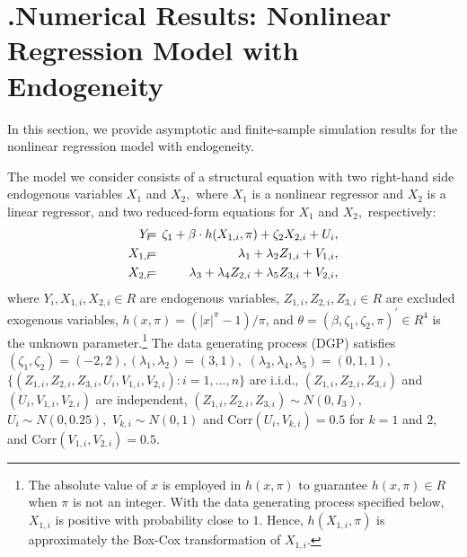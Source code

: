 \documentclass[12pt,titlepage,final,oneside,letterpaper]{article}
\begin{document}
\section{ \hspace{-0.34in}\textbf{.}\hspace{0.2in}Numerical Results:
Nonlinear Regression Model with Endogeneity\label{Numerical Results Sec}}

\hspace{0.25in}\setcounter{equation}{0}In this section, we provide
asymptotic and finite-sample simulation results for the nonlinear regression
model with endogeneity.

The model we consider consists of a structural equation with two right-hand
side endogenous variables $X_{1}$ and $X_{2},$ where $X_{1}$ is a nonlinear
regressor and $X_{2}$ is a linear regressor, and two reduced-form equations
for $X_{1}$ and $X_{2},$ respectively:%
\begin{eqnarray}
Y_{i}\hspace{-0.08in} &=&\hspace{-0.08in}\zeta _{1}+\beta \cdot
h(X_{1,i},\pi )+\zeta _{2}X_{2,i}+U_{i},  \notag \\
X_{1,i}\hspace{-0.08in} &=&\hspace{-0.08in}\lambda _{1}+\lambda
_{2}Z_{1,i}+V_{1,i},  \notag \\
X_{2,i}\hspace{-0.08in} &=&\hspace{-0.08in}\lambda _{3}+\lambda
_{4}Z_{2,i}+\lambda _{5}Z_{3,i}+V_{2,i},
\end{eqnarray}%
where $Y_{i},X_{1,i},X_{2,i}\in R$ are endogenous variables, $%
Z_{1,i},Z_{2,i},Z_{3,i}\in R$ are excluded exogenous variables, $h(x,\pi
)=(|x|^{\pi }-1)/\pi $, and $\theta =(\beta ,\zeta _{1},\zeta _{2},\pi
)^{\prime }\in R^{4}$ is the unknown parameter.\footnote{%
The absolute value of $x$ is employed in $h(x,\pi )$ to guarantee $h(x,\pi
)\in R$ when $\pi $ is not an integer. With the data generating process
specified below, $X_{1,i}$ is positive with probability close to $1.$ Hence, 
$h(X_{1,i},\pi )$ is approximately the Box-Cox transformation of $X_{1,i}.$}
The data generating process (DGP) satisfies $(\zeta _{1},\zeta
_{2})=(-2,2),(\lambda _{1},\lambda _{2})=(3,1),$ $(\lambda _{3},\lambda
_{4},\lambda _{5})=(0,1,1),$ $%
\{(Z_{1,i},Z_{2,i},Z_{3,i},U_{i},V_{1,i},V_{2,i}):i=1,...,n\}$ are i.i.d., $%
(Z_{1,i},Z_{2,i},Z_{3,i})$ and $(U_{i},V_{1,i},V_{2,i})$ are independent, $%
(Z_{1,i},Z_{2,i},Z_{3,i})\sim N(0,I_{3}),$ $U_{i}\sim N(0,0.25),$ $%
V_{k,i}\sim N(0,1)$ and $\mathrm{Corr}(U_{i},V_{k,i})=0.5$ for $k=1$ and $2,$
and $\mathrm{Corr}(V_{1,i},V_{2,i})=0.5.$
\end{document}
